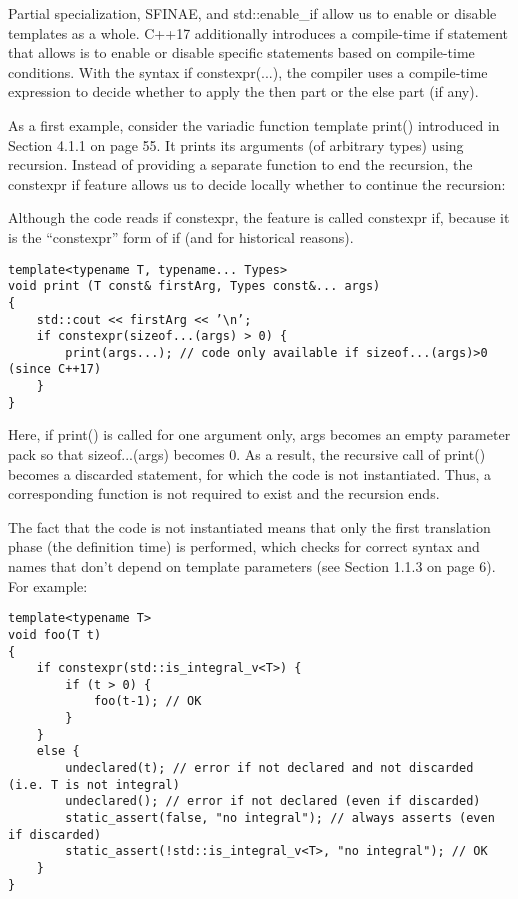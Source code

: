Partial specialization, SFINAE, and std::enable\_if allow us to enable or disable templates as a whole. C++17 additionally introduces a compile-time if statement that allows is to enable or disable specific statements based on compile-time conditions. With the syntax if constexpr(...), the compiler uses a compile-time expression to decide whether to apply the then part or the else part (if any).

As a first example, consider the variadic function template print() introduced in Section 4.1.1 on page 55. It prints its arguments (of arbitrary types) using recursion. Instead of providing a separate function to end the recursion, the constexpr if feature allows us to decide locally whether to continue the recursion:

\begin{tcolorbox}[colback=webgreen!5!white,colframe=webgreen!75!black]
\hspace*{0.75cm}Although the code reads if constexpr, the feature is called constexpr if, because it is the “constexpr” form of if (and for historical reasons).
\end{tcolorbox}

\begin{lstlisting}[style=styleCXX]
template<typename T, typename... Types>
void print (T const& firstArg, Types const&... args)
{
	std::cout << firstArg << ’\n’;
	if constexpr(sizeof...(args) > 0) {
		print(args...); // code only available if sizeof...(args)>0 (since C++17)
	}
}
\end{lstlisting}

Here, if print() is called for one argument only, args becomes an empty parameter pack so that sizeof...(args) becomes 0. As a result, the recursive call of print() becomes a discarded statement, for which the code is not instantiated. Thus, a corresponding function is not required to exist and the recursion ends.

The fact that the code is not instantiated means that only the first translation phase (the definition time) is performed, which checks for correct syntax and names that don’t depend on template parameters (see Section 1.1.3 on page 6). For example:

\begin{lstlisting}[style=styleCXX]
template<typename T>
void foo(T t)
{
	if constexpr(std::is_integral_v<T>) {
		if (t > 0) {
			foo(t-1); // OK
		}
	}
	else {
		undeclared(t); // error if not declared and not discarded (i.e. T is not integral)
		undeclared(); // error if not declared (even if discarded)
		static_assert(false, "no integral"); // always asserts (even if discarded)
		static_assert(!std::is_integral_v<T>, "no integral"); // OK
	}
}
\end{lstlisting}

